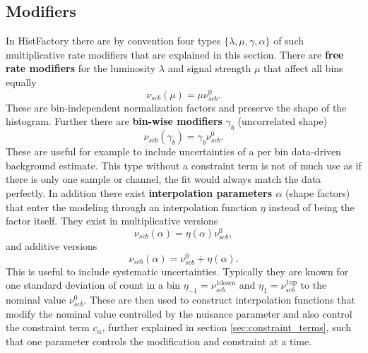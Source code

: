 \subsection{Modifiers}\label{sec:modifiers}
In HistFactory there are by convention four types $\{\lambda,\mu,\gamma,\alpha\}$ of such multiplicative rate modifiers that are explained in this section. There are \textbf{free rate modifiers} for the luminosity $\lambda$ and signal strength $\mu$ that affect all bins equally
\begin{equation}
    \nu_{scb}(\mu)=\mu \nu_{scb}^0.
\end{equation}
These are bin-independent normalization factors and preserve the shape of the histogram.
Further there are \textbf{bin-wise modifiers} $\gamma_b$ (uncorrelated shape)
\begin{equation}
    \nu_{scb}(\gamma_b)=\gamma_b \nu_{scb}^0.
\end{equation}
These are useful for example to include uncertainties of a per bin data-driven background estimate. This type without a constraint term is not of much use as if there is only one sample or channel, the fit would always match the data perfectly.
In addition there exist \textbf{interpolation parameters $\alpha$} (shape factors) that enter the modeling through an interpolation function $\eta$ instead of being the factor itself. They exist in multiplicative versions
\begin{equation}
    \nu_{scb}(\alpha)=\eta(\alpha) \nu_{scb}^0,
\end{equation}
and additive versions
\begin{equation}
    \nu_{scb}(\alpha)=\nu_{scb}^0 + \eta(\alpha).
\end{equation}
This is useful to include systematic uncertainties. Typically they are known for one standard deviation of count in a bin $\eta_{-1}=\nu_{scb}^\mathrm{1down}$ and $\eta_{1}=\nu_{scb}^\mathrm{1up}$ to the nominal value $\nu_{scb}^0$. These are then used to construct interpolation functions that modify the nominal value controlled by the nuisance parameter and also control the constraint term $c_\alpha$, further explained in section \ref{sec:constraint_terms}, such that one parameter controls the modification and constraint at a time.

